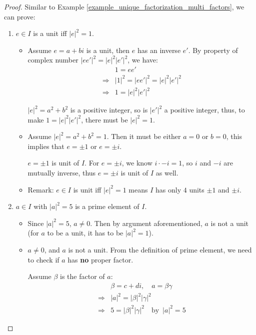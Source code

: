 \documentclass[utf8]{ctexbook}
\theoremstyle{definition}
\begin{document}
\begin{proof}
Similar to Example \ref{example_unique_factorization_multi_factors}, we can prove:
\begin{enumerate}
\item{$ e \in I$ is a unit iff $|e|^2 = 1$.}

\begin{itemize}
\item{Assume $e = a + b i$ is a unit, then $e$ has an inverse $e'$. By property of complex number $|e e'|^2 = |e|^2 |e'|^2$, we have:
\begin{align*}
& 1 = e e' \\
\Longrightarrow & |1 |^2 = |e e'|^2 =  |e|^2 |e'|^2 \\
\Longrightarrow & 1 = |e|^2 |e'|^2
\end{align*}

$|e|^2 = a^2 + b^2$ is a positive integer, so is $|e'|^2$ a positive integer, thus, to make $1 = |e|^2 |e'|^2$, there must be $|e|^2 =1 $.
}
\item{Assume $|e|^2 = a^2 + b^2 = 1$. Then it must be either $a=0$ or $b = 0$, this implies that $e = \pm 1$ or $e = \pm i$.

$e = \pm 1$ is unit of $I$. For $e = \pm i$, we know $i \cdot - i = 1$, so $i$ and $-i$ are mutually inverse, thus $e = \pm i$ is unit of $I$ as well.}
\item{Remark: $e \in I$ is unit iff $|e|^2 = 1$ means $I$ has only $4$ units $\pm 1$ and $\pm i$.}
\end{itemize}


\item{$a \in I$ with $|a|^2 = 5$ is a prime element of $I$.}

\begin{itemize}
\item{Since $|a|^2 = 5$, $a \neq 0$. Then by argument aforementioned, $a$ is not a unit (for $a$ to be a unit, it has to be $|a|^2 = 1$). }
\item{$a \neq 0$, and $a$ is not a unit. From the definition of prime element, we need to check if $a$ has \textbf{no} proper factor.

Assume $\beta$ is the factor of $a$:
\begin{align*}
& \beta = c + d i, \quad a = \beta \gamma \\
\Longrightarrow & |a|^2 = |\beta |^2 | \gamma |^2 \\
\Longrightarrow & 5 =  |\beta |^2 | \gamma |^2 \quad \mbox{by } \, |a|^2 = 5
\end{align*}

}
\end{itemize}
\end{enumerate}
\end{proof}
\end{document}
